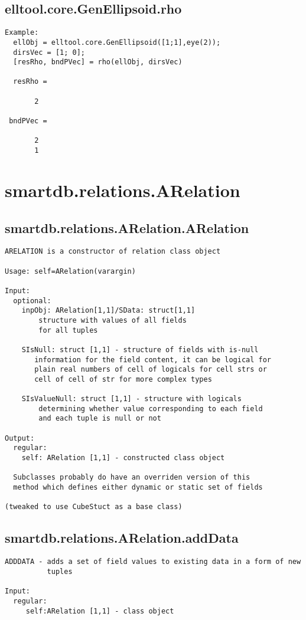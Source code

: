 \subsection{\texorpdfstring{elltool.core.GenEllipsoid.rho}{rho}}\label{method:elltool.core.GenEllipsoid.rho}
\begin{verbatim}
Example:
  ellObj = elltool.core.GenEllipsoid([1;1],eye(2));
  dirsVec = [1; 0];
  [resRho, bndPVec] = rho(ellObj, dirsVec)

  resRho =

       2

 bndPVec =

       2
       1
\end{verbatim}
\section{smartdb.relations.ARelation}\label{secClassDescr:smartdb.relations.ARelation}
\subsection{\texorpdfstring{smartdb.relations.ARelation.ARelation}{ARelation}}\label{method:smartdb.relations.ARelation.ARelation}
\begin{verbatim}
ARELATION is a constructor of relation class object

Usage: self=ARelation(varargin)

Input:
  optional:
    inpObj: ARelation[1,1]/SData: struct[1,1]
        structure with values of all fields
        for all tuples

    SIsNull: struct [1,1] - structure of fields with is-null
       information for the field content, it can be logical for
       plain real numbers of cell of logicals for cell strs or
       cell of cell of str for more complex types

    SIsValueNull: struct [1,1] - structure with logicals
        determining whether value corresponding to each field
        and each tuple is null or not

Output:
  regular:
    self: ARelation [1,1] - constructed class object

  Subclasses probably do have an overriden version of this
  method which defines either dynamic or static set of fields

(tweaked to use CubeStuct as a base class)
\end{verbatim}
\subsection{\texorpdfstring{smartdb.relations.ARelation.addData}{addData}}\label{method:smartdb.relations.ARelation.addData}
\begin{verbatim}
ADDDATA - adds a set of field values to existing data in a form of new
          tuples

Input:
  regular:
     self:ARelation [1,1] - class object
\end{verbatim}
